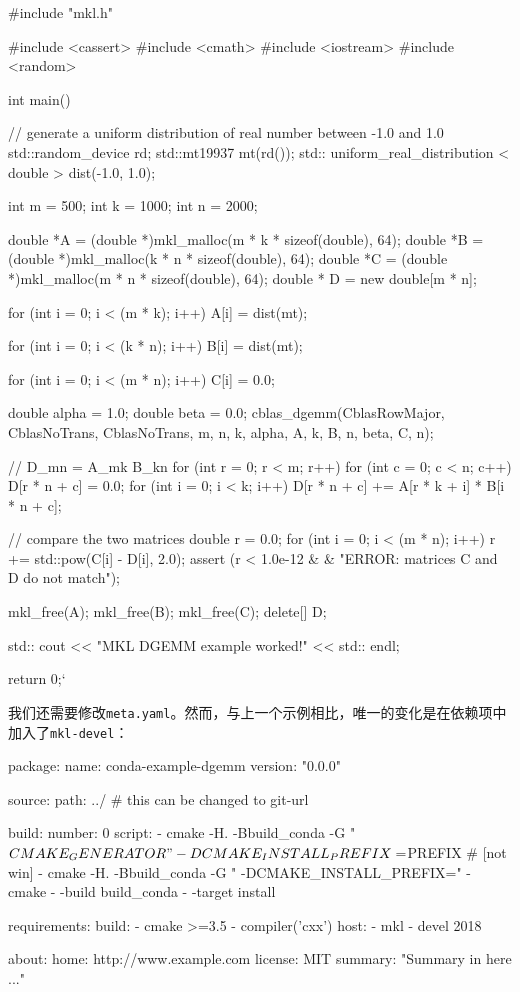 \begin{codebox}[cpp]
#include "mkl.h"

#include <cassert>
#include <cmath>
#include <iostream>
#include <random>

int main() {
  // generate a uniform distribution of real number between -1.0 and 1.0
  std::random_device rd;
  std::mt19937 mt(rd());
  std:: uniform_real_distribution < double > dist(-1.0, 1.0);
  
  int m = 500;
  int k = 1000;
  int n = 2000;

  double *A = (double *)mkl_malloc(m * k * sizeof(double), 64);
  double *B = (double *)mkl_malloc(k * n * sizeof(double), 64);
  double *C = (double *)mkl_malloc(m * n * sizeof(double), 64);
  double * D = new double[m * n];
  
  for (int i = 0; i < (m * k); i++) {
    A[i] = dist(mt);
  }

  for (int i = 0; i < (k * n); i++) {
    B[i] = dist(mt);
  }

  for (int i = 0; i < (m * n); i++) {
    C[i] = 0.0;
  }

  double alpha = 1.0;
  double beta = 0.0;
  cblas_dgemm(CblasRowMajor,
              CblasNoTrans,
              CblasNoTrans,
              m,
              n,
              k,
              alpha,
              A,
              k,
              B,
              n,
              beta,
              C,
              n);

  // D_mn = A_mk B_kn
  for (int r = 0; r < m; r++) {
    for (int c = 0; c < n; c++) {
      D[r * n + c] = 0.0;
      for (int i = 0; i < k; i++) {
        D[r * n + c] += A[r * k + i] * B[i * n + c];
      }
    }
  }

  // compare the two matrices
  double r = 0.0;
  for (int i = 0; i < (m * n); i++) {
    r += std::pow(C[i] - D[i], 2.0);
  }
  assert (r < 1.0e-12 & & "ERROR: matrices C and D do not match");
  
  mkl_free(A);
  mkl_free(B);
  mkl_free(C);
  delete[] D;

  std:: cout << "MKL DGEMM example worked!" << std:: endl;
  
  return 0;`
}
\end{codebox}

我们还需要修改\texttt{meta.yaml}。然而，与上一个示例相比，唯一的变化是在依赖项中加入了\texttt{mkl-devel}：

\begin{codebox}[yaml]
package:
  name: conda-example-dgemm
  version: "0.0.0"

source:
  path: ../ # this can be changed to git-url

build:
  number: 0
  script:
  - cmake -H. -Bbuild_conda -G "${CMAKE_GENERATOR}"
  -DCMAKE_INSTALL_PREFIX=${PREFIX} # [not win]
  - cmake -H. -Bbuild_conda -G "%
  -DCMAKE_INSTALL_PREFIX="%
  - cmake - -build build_conda - -target install
  
requirements:
  build:
    - cmake >=3.5
    - {{ compiler('cxx') }}
  host:
    - mkl - devel 2018
    
about:
  home: http://www.example.com
  license: MIT
  summary: "Summary in here ..."
\end{codebox}

